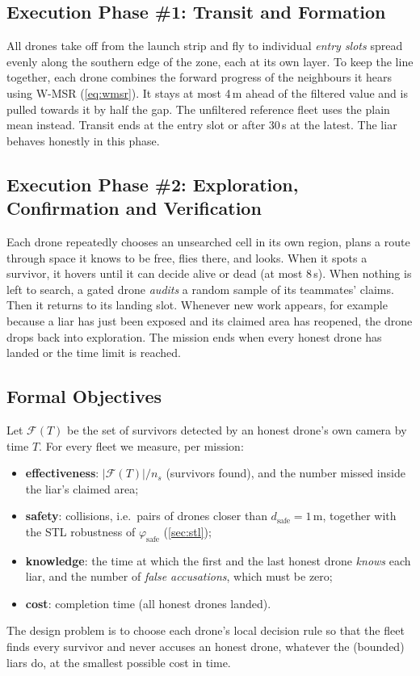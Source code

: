 \subsection{Execution Phase \#1: Transit and Formation}

All drones take off from the launch strip and fly to individual \emph{entry slots} spread evenly along the southern edge
of the zone, each at its own layer. To keep the line together, each drone combines the forward progress of the
neighbours it hears using W-MSR (\autoref{eq:wmsr}). It stays at most 4\,m ahead of the filtered value and is pulled
towards it by half the gap. The unfiltered reference fleet uses the plain mean instead. Transit ends at the entry slot
or after 30\,s at the latest. The liar behaves honestly in this phase.

\subsection{Execution Phase \#2: Exploration, Confirmation and Verification}

Each drone repeatedly chooses an unsearched cell in its own region, plans a route through space it knows to be free,
flies there, and looks. When it spots a survivor, it hovers until it can decide alive or dead (at most 8\,s). When nothing
is left to search, a gated drone \emph{audits} a random sample of its teammates' claims. Then it returns to its landing
slot. Whenever new work appears, for example because a liar has just been exposed and its claimed area has reopened,
the drone drops back into exploration. The mission ends when every honest drone has landed or the time limit is reached.

\subsection{Formal Objectives}

Let $\mathcal{F}(T)$ be the set of survivors detected by an honest drone's own camera by time $T$. For every fleet we
measure, per mission:
\begin{itemize}
    \item \textbf{effectiveness}: $|\mathcal{F}(T)|/n_s$ (survivors found), and the number missed inside the liar's
          claimed area;
    \item \textbf{safety}: collisions, i.e.\ pairs of drones closer than $d_{\mathrm{safe}}=1$\,m, together with the
          STL robustness of $\varphi_{\mathrm{safe}}$ (\autoref{sec:stl});
    \item \textbf{knowledge}: the time at which the first and the last honest drone \emph{knows} each liar, and the
          number of \emph{false accusations}, which must be zero;
    \item \textbf{cost}: completion time (all honest drones landed).
\end{itemize}
The design problem is to choose each drone's local decision rule so that the fleet finds every survivor and never
accuses an honest drone, whatever the (bounded) liars do, at the smallest possible cost in time.

